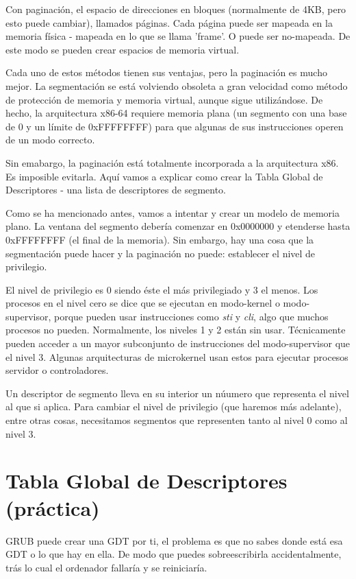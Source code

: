 \documentclass{report}
\begin{document}
Con paginaci\'{o}n, el espacio de direcciones en bloques (normalmente de 4KB, pero esto puede cambiar), llamados p\'{a}ginas. Cada p\'{a}gina puede ser mapeada en la memoria f\'{i}sica - mapeada en lo que se llama 'frame'. O puede ser no-mapeada. De este modo se pueden crear espacios de memoria virtual.

Cada uno de estos m\'{e}todos tienen sus ventajas, pero la paginaci\'{o}n es mucho mejor. La segmentaci\'{o}n se est\'{a} volviendo obsoleta a gran velocidad como m\'{e}todo de protecci\'{o}n de memoria y memoria virtual, aunque sigue utiliz\'{a}ndose. De hecho, la arquitectura x86-64 requiere memoria plana (un segmento con una base de 0 y un l\'{i}mite de 0xFFFFFFFF) para que algunas de sus instrucciones operen de un modo correcto.

Sin emabargo, la paginaci\'{o}n est\'{a} totalmente incorporada a la arquitectura x86. Es imposible evitarla. Aqu\'{i} vamos a explicar como crear la Tabla Global de Descriptores - una lista de descriptores de segmento.

Como se ha mencionado antes, vamos a intentar y crear un modelo de memoria plano. La ventana del segmento deber\'{i}a comenzar en 0x0000000 y etenderse hasta 0xFFFFFFFF (el final de la memoria). Sin embargo, hay una cosa que la segmentaci\'{o}n puede hacer y la paginaci\'{o}n no puede: establecer el nivel de privilegio.

El nivel de privilegio es 0 siendo \'{e}ste el m\'{a}s privilegiado y 3 el menos. Los procesos en el nivel cero se dice que se ejecutan en modo-kernel o modo-supervisor, porque pueden usar instrucciones como \textit{sti} y \textit{cli}, algo que muchos procesos no pueden. Normalmente, los niveles 1 y 2 est\'{a}n sin usar. T\'{e}cnicamente pueden acceder a un mayor subconjunto de instrucciones del modo-supervisor que el nivel 3. Algunas arquitecturas de microkernel usan estos para ejecutar procesos servidor o controladores.

Un descriptor de segmento lleva en su interior un n\'u{u}mero que representa el nivel al que si aplica. Para cambiar el nivel de privilegio (que haremos m\'{a}s adelante), entre otras cosas, necesitamos segmentos que representen tanto al nivel 0 como al nivel 3.

\section{Tabla Global de Descriptores (pr\'{a}ctica)}

GRUB puede crear una GDT por ti, el problema es que no sabes donde est\'{a} esa GDT o lo que hay en ella. De modo que puedes sobreescribirla accidentalmente, tr\'{a}s lo cual el ordenador fallar\'{i}a y se reiniciar\'{i}a.
\end{document}
